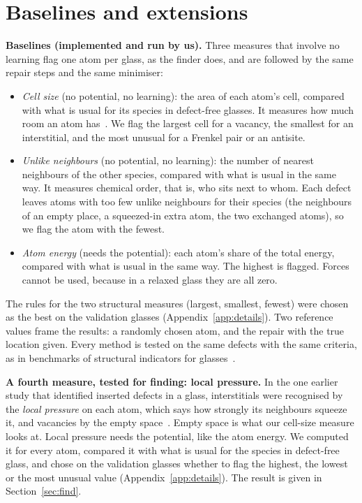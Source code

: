 \documentclass[10pt]{article}
\begin{document}

\section{Baselines and extensions}
\label{sec:baselines}

\textbf{Baselines (implemented and run by us).} Three measures that involve no learning flag one atom per glass, as the finder does, and are followed by the same repair steps and the same minimiser:
\begin{itemize}
\item \emph{Cell size} (no potential, no learning): the area of each atom's cell, compared with what is usual for its species in defect-free glasses. It measures how much room an atom has~\citep{starr2002}. We flag the largest cell for a vacancy, the smallest for an interstitial, and the most unusual for a Frenkel pair or an antisite.
\item \emph{Unlike neighbours} (no potential, no learning): the number of nearest neighbours of the other species, compared with what is usual in the same way. It measures chemical order, that is, who sits next to whom. Each defect leaves atoms with too few unlike neighbours for their species (the neighbours of an empty place, a squeezed-in extra atom, the two exchanged atoms), so we flag the atom with the fewest.
\item \emph{Atom energy} (needs the potential): each atom's share of the total energy, compared with what is usual in the same way. The highest is flagged. Forces cannot be used, because in a relaxed glass they are all zero.
\end{itemize}
The rules for the two structural measures (largest, smallest, fewest) were chosen as the best on the validation glasses (Appendix~\ref{app:details}). Two reference values frame the results: a randomly chosen atom, and the repair with the true location given. Every method is tested on the same defects with the same criteria, as in benchmarks of structural indicators for glasses~\citep{richard2020}.

\textbf{A fourth measure, tested for finding: local pressure.} In the one earlier study that identified inserted defects in a glass, interstitials were recognised by the \emph{local pressure} on each atom, which says how strongly its neighbours squeeze it, and vacancies by the empty space~\citep{laakkonen1988}. Empty space is what our cell-size measure looks at. Local pressure needs the potential, like the atom energy. We computed it for every atom, compared it with what is usual for the species in defect-free glass, and chose on the validation glasses whether to flag the highest, the lowest or the most unusual value (Appendix~\ref{app:details}). The result is given in Section~\ref{sec:find}.
\end{document}
